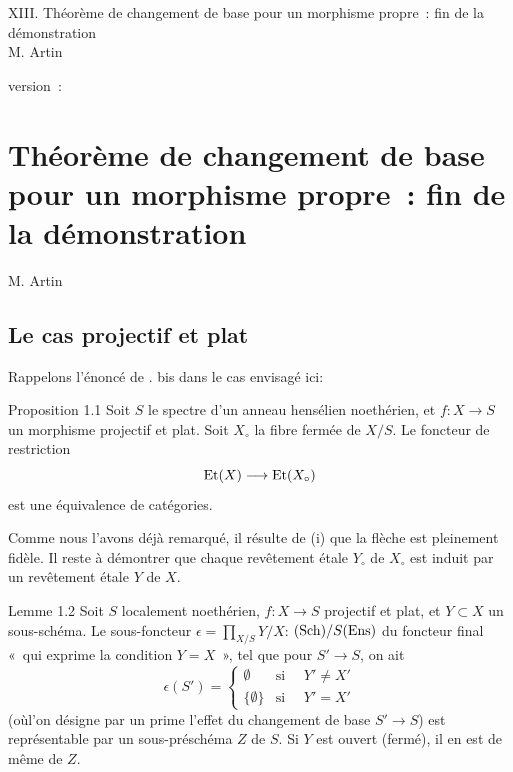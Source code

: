 \documentclass[10pt]{../fichiers-configuration-latex/smfart}
\begin{document}
\begin{center}
XIII. Théorème de changement de base pour un morphisme propre : fin de la démonstration\\
M. Artin 
\end{center}

version : \showgitstatus{}
\tableofcontents

\else
\chapter{Théorème de changement de base pour un morphisme propre : fin de la démonstration}
\begin{center}
M. Artin 
\end{center}
\fi

\setcounter{pageoriginal}{131}

\section{Le cas projectif et plat}\pageoriginale

Rappelons l'énoncé de . bis dans le cas envisagé ici:

\begin{enonce*}{Proposition 1.1}
Soit $S$ le spectre d'un anneau hensélien noethérien, et
$f:X\rightarrow S$ un morphisme projectif et plat. Soit $X_{\circ}$ la
fibre fermée de $X/S$. Le foncteur de restriction
$$
\operatorname{Et}(X)\longrightarrow \operatorname{Et}(X_{\circ})
$$
est une équivalence de catégories.
\end{enonce*}

Comme nous l'avons déjà remarqué, il résulte de  (i) que la
flèche est pleinement fidèle. Il reste à démontrer que chaque
revêtement étale $Y_{\circ}$ de $X_{\circ}$ est induit par un
revêtement étale $Y$ de $X$.

\begin{enonce*}{Lemme 1.2}
Soit $S$ localement noethérien, $f:X\rightarrow S$ projectif et plat,
et $Y\subset X$ un sous-schéma. Le sous-foncteur
$\epsilon=\prod_{X/S}Y/X$: $(\operatorname{Sch})/S(\operatorname{Ens})$ du foncteur final « qui exprime la condition $Y=X$ », \ie tel que pour $S'\rightarrow
S$, on ait
$$
\epsilon(S')=
\begin{cases}
∅ & \mbox{si }\quad Y'\neq X'\\
\{∅\} &\mbox{si }\quad Y'=X'
\end{cases}
$$
(où\pageoriginale l'on désigne par un prime l'effet du changement de base
$S'\rightarrow S$) est représentable par un sous-préschéma $Z$ de
$S$. Si $Y$ est ouvert (\resp fermé), il en est de même de $Z$.
\end{enonce*}
\end{document}
